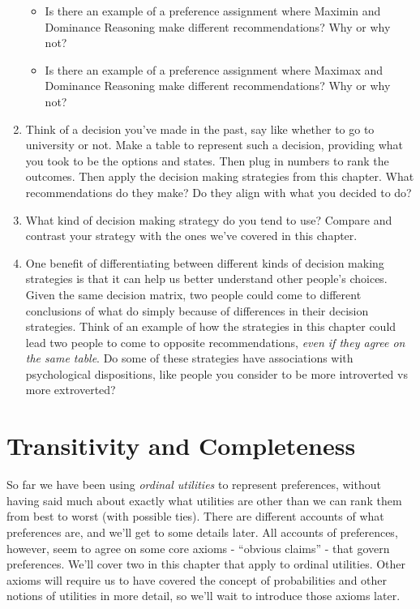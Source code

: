 \documentclass[]{tufte-book}
\providecommand{\tightlist}{%
  \setlength{\itemsep}{0pt}\setlength{\parskip}{0pt}}
\begin{document}
\begin{enumerate}
  \begin{itemize}
  \tightlist
  \item
    Is there an example of a preference assignment where Maximin and Dominance Reasoning make different recommendations? Why or why not?
  \item
    Is there an example of a preference assignment where Maximax and Dominance Reasoning make different recommendations? Why or why not?
  \end{itemize}
\item
  Think of a decision you've made in the past, say like whether to go to university or not. Make a table to represent such a decision, providing what you took to be the options and states. Then plug in numbers to rank the outcomes. Then apply the decision making strategies from this chapter. What recommendations do they make? Do they align with what you decided to do?
\item
  What kind of decision making strategy do you tend to use? Compare and contrast your strategy with the ones we've covered in this chapter.
\item
  One benefit of differentiating between different kinds of decision making strategies is that it can help us better understand other people's choices. Given the same decision matrix, two people could come to different conclusions of what do simply because of differences in their decision strategies. Think of an example of how the strategies in this chapter could lead two people to come to opposite recommendations, \emph{even if they agree on the same table}. Do some of these strategies have associations with psychological dispositions, like people you consider to be more introverted vs more extroverted?
\end{enumerate}

\hypertarget{transitivity-and-completeness}{%
\chapter{Transitivity and Completeness}\label{transitivity-and-completeness}}

So far we have been using \emph{ordinal utilities} to represent preferences, without having said much about exactly what utilities are other than we can rank them from best to worst (with possible ties). There are different accounts of what preferences are, and we'll get to some details later. All accounts of preferences, however, seem to agree on some core axioms - ``obvious claims'' - that govern preferences. We'll cover two in this chapter that apply to ordinal utilities. Other axioms will require us to have covered the concept of probabilities and other notions of utilities in more detail, so we'll wait to introduce those axioms later.
\end{document}
